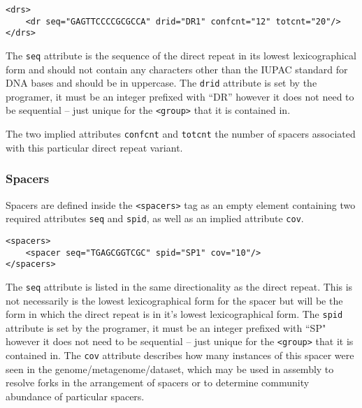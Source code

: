 \documentclass[11pt]{article} %
\begin{document}
\begin{lstlisting}[language=XML_new]
<drs>
	<dr seq="GAGTTCCCCGCGCCA" drid="DR1" confcnt="12" totcnt="20"/>
</drs>
\end{lstlisting}

The \lstinline[language=XML_new]$seq$ attribute is the sequence of the direct repeat in its lowest lexicographical form and should not contain any characters other than the IUPAC standard for DNA bases and should be in uppercase.   The \lstinline[language=XML_new]$drid$ attribute is set by the programer, it must be an integer prefixed with ``DR'' however it does not need to be sequential -- just unique for the \lstinline[language=XML_new]$<group>$ that it is contained in.  

The two implied attributes \lstinline[language=XML_new]$confcnt$ and \lstinline[language=XML_new]$totcnt$
the number of spacers associated with this particular direct repeat variant.
\subsubsection{Spacers}
Spacers are defined inside the \lstinline[language=XML_new]$<spacers>$ tag as an empty element containing two required attributes \lstinline[language=XML_new]$seq$ and \lstinline[language=XML_new]$spid$, as well as an implied attribute \lstinline[language=XML_new]$cov$.
\begin{lstlisting}[language=XML_new]
<spacers>
	<spacer seq="TGAGCGGTCGC" spid="SP1" cov="10"/>
</spacers>
\end{lstlisting}
The \lstinline[language=XML_new]$seq$ attribute is listed in the same directionality as the direct repeat.  This is not necessarily is the lowest lexicographical form for the spacer but will be the form in which the direct repeat is in it's lowest lexicographical form.  The \lstinline[language=XML_new]$spid$ attribute is set by the programer, it must be an integer prefixed with ``SP" however it does not need to be sequential -- just unique for the \lstinline[language=XML_new]$<group>$ that it is contained in.  The \lstinline[language=XML_new]$cov$ attribute describes how many instances of this spacer were seen in the genome/metagenome/dataset, which may be used in assembly to resolve forks in the arrangement of spacers or to determine community abundance of particular spacers. 
\end{document}
